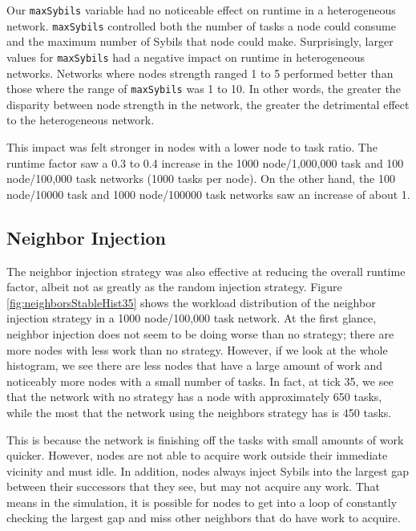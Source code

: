 \documentclass[10pt,conference]{IEEEtran}
\begin{document}
	Our \texttt{maxSybils} variable had no noticeable effect on runtime in a heterogeneous network.
	\texttt{maxSybils} controlled both the number of tasks a node could consume and the maximum number of Sybils that node could make.
	Surprisingly, larger values for \texttt{maxSybils} had a negative impact on runtime in heterogeneous networks.
	Networks where nodes strength ranged 1 to 5 performed better than those where the range of \texttt{maxSybils} was 1 to 10.
	In other words, the greater the disparity between node strength in the network, the greater the detrimental effect to the heterogeneous network.
	
	This impact was felt stronger in nodes with a lower node to task ratio.
	The runtime factor saw  a 0.3 to 0.4 increase in the 1000 node/1,000,000 task and 100 node/100,000 task networks (1000 tasks per node).
	On the other hand, the 100 node/10000 task  and 1000 node/100000 task networks saw an increase of about 1.
	
	
	
	\subsection{Neighbor Injection}
	The neighbor injection strategy was also effective at reducing the overall runtime factor, albeit not as greatly as the random injection strategy.
	Figure \ref{fig:neighborsStableHist35} shows the workload distribution of the neighbor injection strategy in a 1000 node/100,000 task network.
	At the first glance, neighbor injection does not seem to be doing worse than no strategy; there are more nodes with less work than no strategy.
	However, if we look at the whole histogram, we see there are less nodes that have a large amount of work and noticeably more nodes with a small number of tasks.
	In fact, at tick 35, we see that the network with no strategy has a node with approximately 650 tasks, while the most that the network using the neighbors strategy has is 450 tasks.
	
	This is because the network is finishing off the tasks with small amounts of work quicker.
	However, nodes are not able to acquire work outside their immediate vicinity and must idle.
	In addition, nodes always inject Sybils into the largest gap between their successors that they see, but may not acquire any work.
	That means in the simulation, it is possible for nodes to get into a loop of constantly checking the largest gap and miss other neighbors that do have work to acquire.%
	
\end{document}

